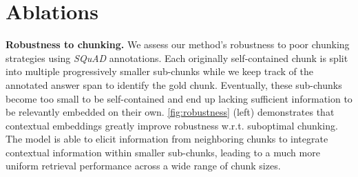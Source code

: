 \section{Ablations}













\noindent\textbf{Robustness to chunking.}
We assess our method's robustness to poor chunking strategies using \emph{SQuAD} annotations.  Each originally self-contained chunk is split into multiple progressively smaller sub-chunks while we keep track of the annotated answer span to identify the gold chunk. Eventually, these sub-chunks become too small to be self-contained and end up lacking sufficient information to be relevantly embedded on their own. \autoref{fig:robustness} (left) demonstrates that contextual embeddings greatly improve robustness w.r.t. suboptimal chunking. The model is able to elicit information from neighboring chunks to integrate contextual information within smaller sub-chunks, leading to a much more uniform retrieval performance across a wide range of chunk sizes.


